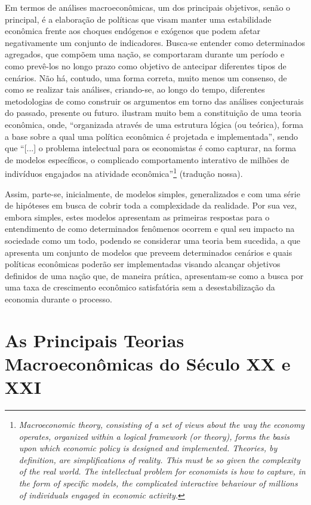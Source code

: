 Em termos de análises macroeconômicas, um dos principais objetivos, senão o principal, é a elaboração de políticas que visam manter uma estabilidade econômica frente aos choques endógenos e exógenos que podem afetar negativamente um conjunto de indicadores. Busca-se entender como determinados agregados, que compõem uma nação, se comportaram durante um período e como prevê-los no longo prazo como objetivo de antecipar diferentes tipos de cenários. Não há, contudo, uma forma correta, muito menos um consenso, de como se realizar tais análises, criando-se, ao longo do tempo, diferentes metodologias de como construir os argumentos em torno das análises conjecturais do passado, presente ou futuro. \citeauthor*{snowdon_modern_2005} ilustram muito bem a constituição de uma teoria econômica, onde, \enquote{organizada através de uma estrutura lógica (ou teórica), forma a base sobre a qual uma política econômica é projetada e implementada}, sendo que \enquote{[...] o problema intelectual para os economistas é como capturar, na forma de modelos específicos, o complicado comportamento interativo de milhões de indivíduos engajados na atividade econômica}\footnote{\textit{Macroeconomic theory, consisting of a set of views about the way the economy operates, organized within a logical framework (or theory), forms the basis upon which economic policy is designed and implemented. Theories, by definition, are simplifications of reality. This must be so given the complexity of the real world. The intellectual problem for economists is how to capture, in the form of specific models, the complicated interactive behaviour of millions of individuals engaged in economic activity.}} \citep[pg.4]{snowdon_modern_2005} (tradução nossa).

Assim, parte-se, inicialmente, de modelos simples, generalizados e com uma série de hipóteses em busca de cobrir toda a complexidade da realidade. Por sua vez, embora simples, estes modelos apresentam as primeiras respostas para o entendimento de como determinados fenômenos ocorrem e qual seu impacto na sociedade como um todo, podendo se considerar uma teoria bem sucedida, a que apresenta um conjunto de modelos que preveem determinados cenários e quais políticas econômicas poderão ser implementadas visando alcançar objetivos definidos de uma nação que, de maneira prática, apresentam-se como a busca por uma taxa de crescimento econômico satisfatória sem a desestabilização da economia durante o processo.

\section{As Principais Teorias Macroeconômicas do Século XX e XXI}
\label{sec:AsPrincipaisTeoriasEconomicasDoSeculoXXeXXI}

